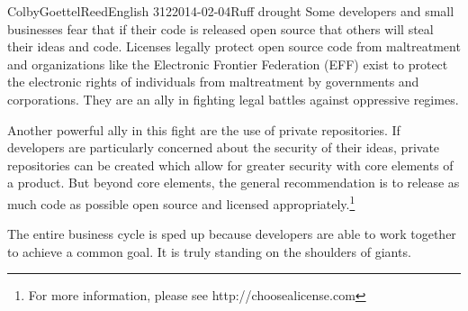 \documentclass[12pt]{article}
\begin{document}
\begin{mla}{Colby}{Goettel}{Reed}{English 312}{2014-02-04}{Ruff drought}
Some developers and small businesses fear that if their code is released open source that others will steal their ideas and code. Licenses legally protect open source code from maltreatment and organizations like the Electronic Frontier Federation (EFF) exist to protect the electronic rights of individuals from maltreatment by governments and corporations. They are an ally in fighting legal battles against oppressive regimes.

Another powerful ally in this fight are the use of private repositories. If developers are particularly concerned about the security of their ideas, private repositories can be created which allow for greater security with core elements of a product. But beyond core elements, the general recommendation is to release as much code as possible open source and licensed appropriately.\footnote{For more information, please see http://choosealicense.com}





The entire business cycle is sped up because developers are able to work together to achieve a common goal. It is truly standing on the shoulders of giants.

\end{mla}
\end{document}
